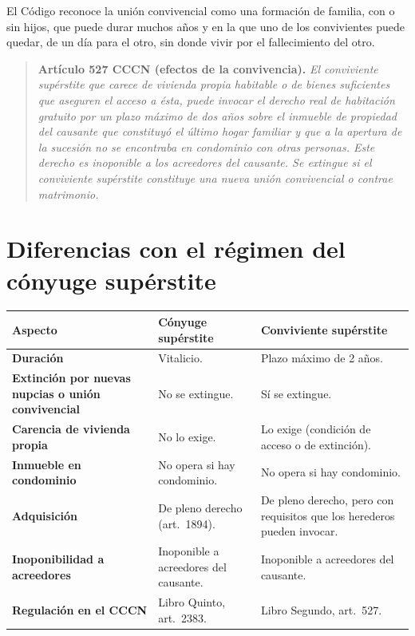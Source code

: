 \documentclass[12pt,oneside]{book}
\begin{document}
El Código reconoce la unión convivencial como una formación de familia, con o sin hijos, que puede durar muchos años y en la que uno de los convivientes puede quedar, de un día para el otro, sin donde vivir por el fallecimiento del otro.

\begin{quote}
\textbf{Artículo 527 CCCN (efectos de la convivencia).} \textit{El conviviente supérstite que carece de vivienda propia habitable o de bienes suficientes que aseguren el acceso a ésta, puede invocar el derecho real de habitación gratuito por un plazo máximo de dos años sobre el inmueble de propiedad del causante que constituyó el último hogar familiar y que a la apertura de la sucesión no se encontraba en condominio con otras personas. Este derecho es inoponible a los acreedores del causante. Se extingue si el conviviente supérstite constituye una nueva unión convivencial o contrae matrimonio.}
\end{quote}

\section{Diferencias con el régimen del cónyuge supérstite}

\begin{table}[H]
\centering
\begin{tabularx}{\textwidth}{
    >{\raggedright\arraybackslash}p{}
    >{\raggedright\arraybackslash}X
    >{\raggedright\arraybackslash}X
}
\toprule
\textbf{Aspecto} & \textbf{Cónyuge supérstite} & \textbf{Conviviente supérstite} \\
\midrule
\textbf{Duración} & Vitalicio. & Plazo máximo de 2 años. \\
\textbf{Extinción por nuevas nupcias o unión convivencial} & No se extingue. & Sí se extingue. \\
\textbf{Carencia de vivienda propia} & No lo exige. & Lo exige (condición de acceso o de extinción). \\
\textbf{Inmueble en condominio} & No opera si hay condominio. & No opera si hay condominio. \\
\textbf{Adquisición} & De pleno derecho (art.~1894). & De pleno derecho, pero con requisitos que los herederos pueden invocar. \\
\textbf{Inoponibilidad a acreedores} & Inoponible a acreedores del causante. & Inoponible a acreedores del causante. \\
\textbf{Regulación en el CCCN} & Libro Quinto, art.~2383. & Libro Segundo, art.~527. \\
\bottomrule
\end{tabularx}
\end{table}
\end{document}
